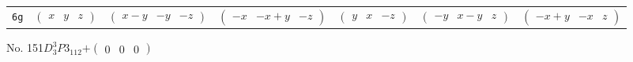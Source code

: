 \documentclass[fleqn,9pt,landscape]{jsarticle}
\begin{document}
\begin{center}
\begin{longtable}{ccccccc}
{\tt 6g} & $ \begin{pmatrix} x & y & z \end{pmatrix} $ & $ \begin{pmatrix} x - y & - y & - z \end{pmatrix} $ & $ \begin{pmatrix} - x & - x + y & - z \end{pmatrix} $ & $ \begin{pmatrix} y & x & - z \end{pmatrix} $ & $ \begin{pmatrix} - y & x - y & z \end{pmatrix} $ & $ \begin{pmatrix} - x + y & - x & z \end{pmatrix} $ \\
\end{longtable}
\end{center}
\newpage
No. 151\quad$D_{3}^{3}$\quad$P3_112$\quad[ trigonal ]\quad$+\begin{pmatrix} 0 & 0 & 0 \end{pmatrix}$
\end{document}
